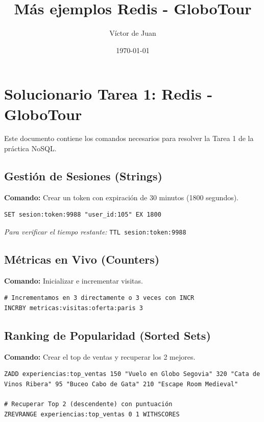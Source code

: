 \documentclass[12pt,a4paper]{article}
\title{\textbf{Más ejemplos Redis - GloboTour}}
\author{Víctor de Juan}
\date{\today}
\begin{document}
\maketitle

\hypertarget{solucionario-tarea-1-redis---globotour}{%
\section{Solucionario Tarea 1: Redis -
GloboTour}\label{solucionario-tarea-1-redis---globotour}}

Este documento contiene los comandos necesarios para resolver la Tarea 1
de la práctica NoSQL.

\hypertarget{gestiuxf3n-de-sesiones-strings}{%
\subsection{Gestión de Sesiones
(Strings)}\label{gestiuxf3n-de-sesiones-strings}}

\textbf{Comando:} Crear un token con expiración de 30 minutos (1800
segundos).

\begin{lstlisting}
SET sesion:token:9988 "user_id:105" EX 1800
\end{lstlisting}

\emph{Para verificar el tiempo restante:}
\texttt{TTL sesion:token:9988}

\hypertarget{muxe9tricas-en-vivo-counters}{%
\subsection{Métricas en Vivo
(Counters)}\label{muxe9tricas-en-vivo-counters}}

\textbf{Comando:} Inicializar e incrementar visitas.

\begin{lstlisting}
# Incrementamos en 3 directamente o 3 veces con INCR
INCRBY metricas:visitas:oferta:paris 3
\end{lstlisting}

\hypertarget{ranking-de-popularidad-sorted-sets}{%
\subsection{Ranking de Popularidad (Sorted
Sets)}\label{ranking-de-popularidad-sorted-sets}}

\textbf{Comando:} Crear el top de ventas y recuperar los 2 mejores.

\begin{lstlisting}
ZADD experiencias:top_ventas 150 "Vuelo en Globo Segovia" 320 "Cata de Vinos Ribera" 95 "Buceo Cabo de Gata" 210 "Escape Room Medieval"

# Recuperar Top 2 (descendente) con puntuación
ZREVRANGE experiencias:top_ventas 0 1 WITHSCORES
\end{lstlisting}
\end{document}

